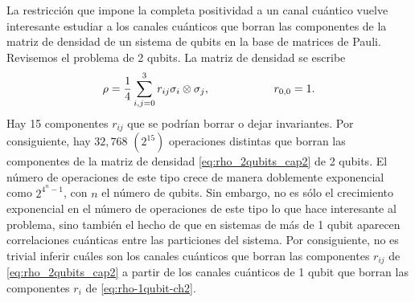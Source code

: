
La restricción que impone la completa positividad a un canal cuántico 
vuelve interesante estudiar a los canales cuánticos que borran las componentes 
de la matriz de densidad de un sistema de qubits en la base de matrices 
de Pauli. Revisemos el problema de 2 qubits. La matriz de densidad
se escribe
\begin{align}\label{eq:rho_2qubits_cap2}
\rho = \frac{1}{4}\sum_{i,j=0}^3r_{ij}\sigma_i\otimes\sigma_j, 
\hspace{2cm} r_{0,0}=1.
\end{align}
Hay 15 componentes $r_{ij}$ que se podrían borrar o dejar invariantes. 
Por consiguiente, hay $32,768$ $(2^{15})$ operaciones distintas que borran las 
componentes de la matriz de densidad \eqref{eq:rho_2qubits_cap2} de 2 qubits. 
El número de operaciones de este tipo crece de manera doblemente 
exponencial 
como $2^{4^n-1}$, con $n$ el número de qubits. Sin embargo, no es 
sólo el crecimiento exponencial en el número de operaciones de este tipo
lo que hace interesante al problema, sino también el hecho de que en 
sistemas de más de 1 qubit aparecen correlaciones cuánticas entre 
las particiones del sistema. Por consiguiente, no es trivial inferir cuáles son los 
canales cuánticos que borran las componentes $r_{ij}$ de 
\eqref{eq:rho_2qubits_cap2} a partir de los canales cuánticos 
de 1 qubit que borran las componentes $r_i$ de \eqref{eq:rho-1qubit-ch2}.


